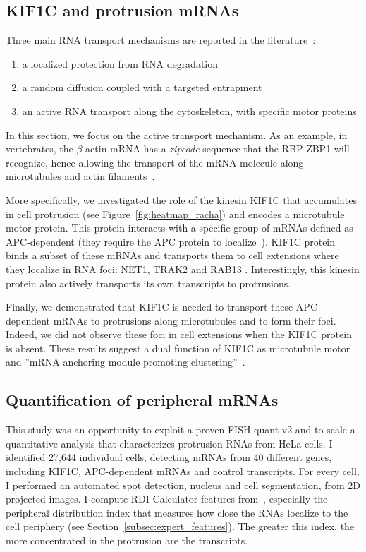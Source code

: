 \subsection{KIF1C and protrusion mRNAs}
\label{subsec:introduction_protrusion}

Three main \ac{RNA} transport mechanisms are reported in the literature~\cite{Medioni_2012, Bovaird_2018}:
\begin{enumerate}
	\setlength\itemsep{0.1em}
	\item a localized protection from \ac{RNA} degradation
	\item a random diffusion coupled with a targeted entrapment
	\item an active \ac{RNA} transport along the cytoskeleton, with specific motor proteins
\end{enumerate}

\noindent
In this section, we focus on the active transport mechanism.
As an example, in vertebrates, the $\beta$-actin \ac{mRNA} has a \emph{zipcode} sequence that the \ac{RBP} ZBP1 will recognize, hence allowing the transport of the \ac{mRNA} molecule along microtubules and actin filaments~\cite{Oleynikov_2003}.

More specifically, we investigated the role of the kinesin KIF1C that accumulates in cell protrusion (see Figure~\ref{fig:heatmap_racha}) and encodes a microtubule motor protein.
This protein interacts with a specific group of \ac{mRNA}s defined as APC-dependent (they require the APC protein to localize~\cite{wang_extracellular_2017}).
KIF1C protein binds a subset of these \ac{mRNA}s and transports them to cell extensions where they localize in RNA foci: NET1, TRAK2 and RAB13 .
Interestingly, this kinesin protein also actively transports its own transcripts to protrusions.

Finally, we demonstrated that KIF1C is needed to transport these APC-dependent \ac{mRNA}s to protrusions along microtubules and to form their foci.
Indeed, we did not observe these foci in cell extensions when the KIF1C protein is absent.
These results suggest a dual function of KIF1C as microtubule motor and ''\ac{mRNA} anchoring module promoting clustering''~\cite{pichon_kinesin_2021}.

\subsection{Quantification of peripheral mRNAs}
\label{subsec:materials_results_protrusion}

This study was an opportunity to exploit a proven FISH-quant v2 and to scale a quantitative analysis that characterizes protrusion \ac{RNA}s from HeLa cells.
I identified 27,644 individual cells, detecting \ac{mRNA}s from 40 different genes, including KIF1C, APC-dependent \ac{mRNA}s and control transcripts.
For every cell, I performed an automated spot detection, nucleus and cell segmentation, from 2D projected images.
I compute RDI Calculator features from~\cite{stueland_rdi_2019}, especially the peripheral distribution index that measures how close the \ac{RNA}s localize to the cell periphery (see Section~\ref{subsec:expert_features}).
The greater this index, the more concentrated in the protrusion are the transcripts.

